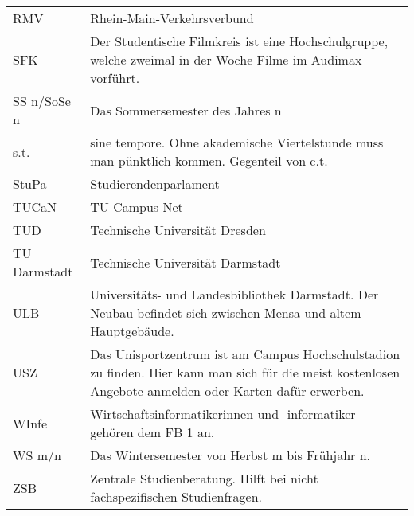 \begin{longtable}{p{20mm}p{85mm}}
RMV		&	Rhein-Main-Verkehrsverbund\\
SFK		&	Der Studentische Filmkreis ist eine Hochschulgruppe, welche zweimal in der Woche Filme im Audimax vorführt.\\
SS n/SoSe n&Das Sommersemester des Jahres n\\
s.t.	&	sine tempore. Ohne akademische Viertelstunde muss man pünktlich kommen. Gegenteil von c.t.\\
StuPa	&	Studierendenparlament\\
TUCaN	&	TU-Campus-Net\\
TUD		&	Technische Universität Dresden\\
TU Darmstadt&Technische Universität Darmstadt\\
ULB		&	Universitäts- und Landesbibliothek Darmstadt. Der Neubau befindet sich zwischen Mensa und altem Hauptgebäude.\\
USZ		&	Das Unisportzentrum ist am Campus Hochschulstadion zu finden. Hier kann man sich für die meist kostenlosen Angebote anmelden oder Karten dafür erwerben.\\
WInfe	&	Wirtschaftsinformatikerinnen und -informatiker gehören dem FB 1 an.\\
WS m/n	&	Das Wintersemester von Herbst m bis Frühjahr n.\\
ZSB		&	Zentrale Studienberatung. Hilft bei nicht fachspezifischen Studienfragen.\\
\end{longtable}

\newpage
